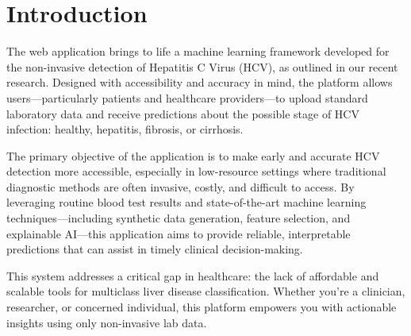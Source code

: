 \section{Introduction}
The web application brings to life a machine learning framework developed
for the non-invasive detection of Hepatitis C Virus (HCV),
as outlined in our recent research. Designed with accessibility and accuracy in mind,
the platform allows users—particularly patients and healthcare providers—to
upload standard laboratory data and receive predictions about the possible stage
of HCV infection: healthy, hepatitis, fibrosis, or cirrhosis.

The primary objective of the application is to make early and accurate
HCV detection more accessible, especially in low-resource settings where traditional
diagnostic methods are often invasive, costly, and difficult to access.
By leveraging routine blood test results and state-of-the-art machine learning
techniques—including synthetic data generation, feature selection,
and explainable AI—this application aims to provide reliable, interpretable
predictions that can assist in timely clinical decision-making.

This system addresses a critical gap in healthcare: the lack of affordable
and scalable tools for multiclass liver disease classification.
Whether you're a clinician, researcher, or concerned individual,
this platform empowers you with actionable insights using only non-invasive lab data.



